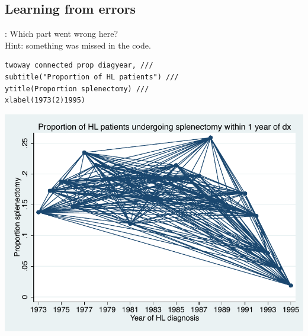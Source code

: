 \subsection{Learning from errors}
\begin{frame}[fragile]{\secname: \subsecname}
Which part went wrong here? \\
Hint: something was missed in the code.

\small
\begin{verbatim}
twoway connected prop diagyear, ///
subtitle("Proportion of HL patients") ///
ytitle(Proportion splenectomy) ///
xlabel(1973(2)1995) 	
\end{verbatim}
\begin{center}
	\includegraphics[scale=0.4]{images/nosort}
\end{center}
\end{frame}

